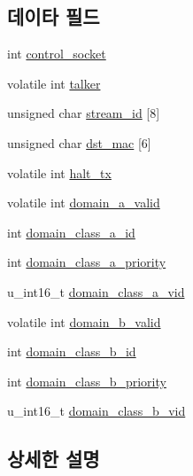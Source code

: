 \subsection*{데이타 필드}
\begin{DoxyCompactItemize}
\item 
int \hyperlink{structmrp__listener__ctx_ab16a0c776c464dcfb5cf8a013a137647}{control\+\_\+socket}
\item 
volatile int \hyperlink{structmrp__listener__ctx_afd1cfb96f67ad1b881b86ccbbf7af341}{talker}
\item 
unsigned char \hyperlink{structmrp__listener__ctx_a190ce42cbfefb20ada402ce90519cc32}{stream\+\_\+id} \mbox{[}8\mbox{]}
\item 
unsigned char \hyperlink{structmrp__listener__ctx_adfd737d7370a81c521ecc86600c9922a}{dst\+\_\+mac} \mbox{[}6\mbox{]}
\item 
volatile int \hyperlink{structmrp__listener__ctx_a7c8176263e9704aa667fc335cc818a3f}{halt\+\_\+tx}
\item 
volatile int \hyperlink{structmrp__listener__ctx_ae3be05692572d8c757174629541e2d91}{domain\+\_\+a\+\_\+valid}
\item 
int \hyperlink{structmrp__listener__ctx_a6e4374793667e90915abfe73f0e6201c}{domain\+\_\+class\+\_\+a\+\_\+id}
\item 
int \hyperlink{structmrp__listener__ctx_ac98b99ec0ffd190c1da93e6caffe36d4}{domain\+\_\+class\+\_\+a\+\_\+priority}
\item 
u\+\_\+int16\+\_\+t \hyperlink{structmrp__listener__ctx_ac575246135a50baaf0c802ef29aa2779}{domain\+\_\+class\+\_\+a\+\_\+vid}
\item 
volatile int \hyperlink{structmrp__listener__ctx_add1f58f9a17de764566dbf2e352b907f}{domain\+\_\+b\+\_\+valid}
\item 
int \hyperlink{structmrp__listener__ctx_a058aabd498c78e32b6610fd06f90fc43}{domain\+\_\+class\+\_\+b\+\_\+id}
\item 
int \hyperlink{structmrp__listener__ctx_a90efafdfc3b16f51cc0f67aa65796a3c}{domain\+\_\+class\+\_\+b\+\_\+priority}
\item 
u\+\_\+int16\+\_\+t \hyperlink{structmrp__listener__ctx_a153312a7212b932f60b49a67309f2053}{domain\+\_\+class\+\_\+b\+\_\+vid}
\end{DoxyCompactItemize}


\subsection{상세한 설명}


